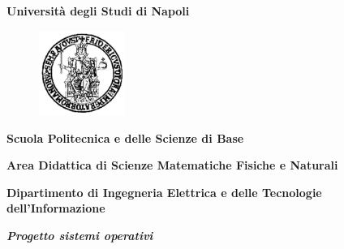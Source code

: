 \documentclass[a4paper]{article}
\begin{document}
 
\begin{titlepage}

\begin{center}
    {\bfseries\Huge Università degli Studi di Napoli\\}
\end{center} 

\begin{figure}[h]
    \begin{center}
        
\includegraphics[width=0.25\textwidth]{fiilogo.png}    %
    \end{center}
\end{figure}
  
\begin{center}
    \bf{Scuola Politecnica e delle Scienze di Base}
\end{center}
\begin{center}
    \bf{Area Didattica di Scienze Matematiche Fisiche e Naturali}
\end{center}
\vspace{5pt}
\begin{center}
    \textbf{Dipartimento di Ingegneria Elettrica e delle Tecnologie dell'Informazione}
\end{center}
\vspace{40pt}
\begin{center}
    {\emph{\Large{\bf{Progetto sistemi operativi}}}}\\
    
\end{center}
\vspace{15pt}



\end{titlepage}
\end{document}
